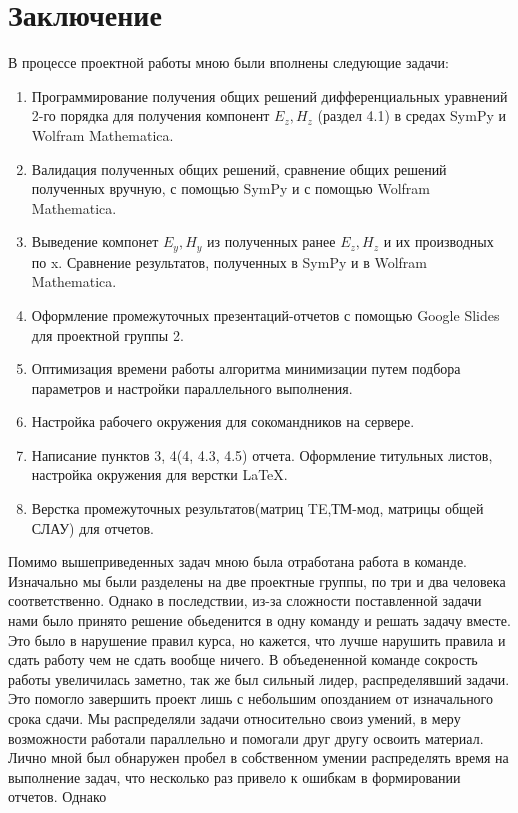 \documentclass{article}
\begin{document}
\newpage

\section{Заключение}

В процессе проектной работы мною были вполнены следующие задачи:
\begin{enumerate}

\item Программирование получения общих решений дифференциальных уравнений 2-го порядка для получения компонент $E_z, H_z$ (раздел 4.1) в средах SymPy и Wolfram Mathematica.
\item Валидация полученных общих решений, сравнение общих решений полученных вручную, с помощью
SymPy и с помощью Wolfram Mathematica.
\item Выведение компонет $E_y, H_y$ из полученных ранее $E_z, H_z$ и их производных по x. Сравнение результатов,
полученных в SymPy и в Wolfram Mathematica.
\item Оформление промежуточных презентаций-отчетов с помощью Google Slides для проектной группы 2.
\item Оптимизация времени работы алгоритма минимизации путем подбора параметров и настройки параллельного выполнения.
\item  Настройка рабочего окружения для сокомандников на сервере.
\item  Написание пунктов 3, 4(4, 4.3, 4.5) отчета. Оформление титульных листов, настройка окружения для
верстки \LaTeX.
\item  Верстка промежуточных результатов(матриц TE,ТМ-мод, матрицы общей СЛАУ) для отчетов.
    
\end{enumerate}
Помимо вышеприведенных задач мною была отработана работа в команде. Изначально мы были разделены на две проектные группы, по три и два человека соответственно. Однако в последствии, из-за сложности
поставленной задачи нами было принято решение обьеденится в одну команду и решать задачу вместе. Это
было в нарушение правил курса, но кажется, что лучше нарушить правила и сдать работу чем не сдать
вообще ничего. В объедененной команде сокрость работы увеличилась заметно, так же был сильный лидер,
распределявший задачи. Это помогло завершить проект лишь с небольшим опозданием от изначального срока сдачи. Мы распределяли задачи относительно своиз умений, в меру возможности работали параллельно
и помогали друг другу освоить материал. Лично мной был обнаружен пробел в собственном умении распределять время на выполнение задач, что несколько раз привело к ошибкам в формировании отчетов. Однако
\end{document}
